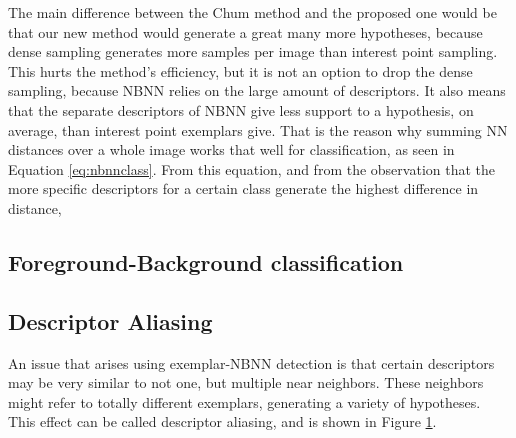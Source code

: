 The main difference between the Chum method and the proposed one would be that our new method would generate a great many more hypotheses, because dense sampling generates more samples per image than interest point sampling. This hurts the method's efficiency, but it is not an option to drop the dense sampling, because NBNN relies on the large amount of descriptors. It also means that the separate descriptors of NBNN give less support to a hypothesis, on average, than interest point exemplars give. That is the reason why summing NN distances over a whole image works that well for classification, as seen in Equation \eqref{eq:nbnnclass}. From this equation, and from the observation that the more specific descriptors for a certain class generate the highest difference in distance, 




\subsection{Foreground-Background classification} %
\label{sec:foreground_background_classification}

\subsection{Descriptor Aliasing} %
\label{sec:descriptor_aliasing}

An issue that arises using exemplar-NBNN detection is that certain descriptors may be very similar to not one, but multiple near neighbors. These neighbors might refer to totally different exemplars, generating a variety of hypotheses. This effect can be called descriptor aliasing, and is shown in Figure \ref{fig:aliasing}.

\begin{figure}[hbt]
    \label{fig:aliasing}
    \centering
\end{figure}

